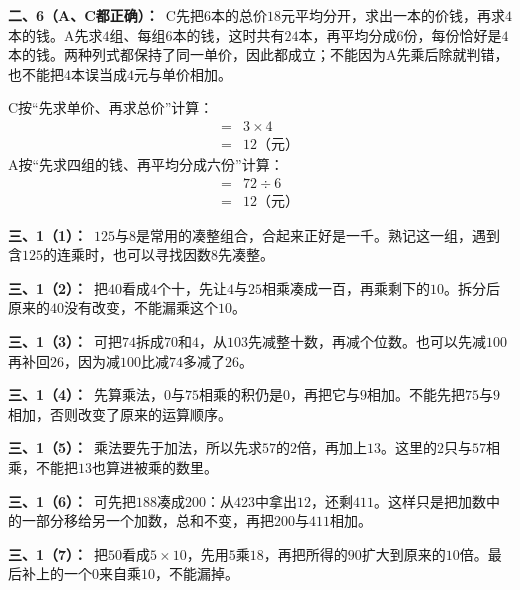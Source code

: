 \documentclass[multi=snippet,border=0pt]{standalone}
\newenvironment{snippet}[3]{\begin{minipage}{#1bp}\color{answerred}\fontsize{#2}{#3}\selectfont\raggedright}{\end{minipage}}
\begin{document}
\begin{snippet}{505}{11.5}{14}\textbf{二、6（A、C都正确）：}\ C先把\(6\)本的总价\(18\)元平均分开，求出一本的价钱，再求\(4\)本的钱。A先求\(4\)组、每组\(6\)本的钱，这时共有\(24\)本，再平均分成\(6\)份，每份恰好是\(4\)本的钱。两种列式都保持了同一单价，因此都成立；不能因为A先乘后除就判错，也不能把\(4\)本误当成\(4\)元与单价相加。\par C按“先求单价、再求总价”计算：\[\begin{aligned}={}&3\times4\\={}&12\text{（元）}\end{aligned}\]A按“先求四组的钱、再平均分成六份”计算：\[\begin{aligned}={}&72\div6\\={}&12\text{（元）}\end{aligned}\]\end{snippet}
\begin{snippet}{505}{11.5}{14}\textbf{三、1（1）：}\ \(125\)与\(8\)是常用的凑整组合，合起来正好是一千。熟记这一组，遇到含\(125\)的连乘时，也可以寻找因数\(8\)先凑整。\end{snippet}
\begin{snippet}{505}{11.5}{14}\textbf{三、1（2）：}\ 把\(40\)看成\(4\)个十，先让\(4\)与\(25\)相乘凑成一百，再乘剩下的\(10\)。拆分后原来的\(40\)没有改变，不能漏乘这个\(10\)。\end{snippet}
\begin{snippet}{505}{11.5}{14}\textbf{三、1（3）：}\ 可把\(74\)拆成\(70\)和\(4\)，从\(103\)先减整十数，再减个位数。也可以先减\(100\)再补回\(26\)，因为减\(100\)比减\(74\)多减了\(26\)。\end{snippet}
\begin{snippet}{505}{11.5}{14}\textbf{三、1（4）：}\ 先算乘法，\(0\)与\(75\)相乘的积仍是\(0\)，再把它与\(9\)相加。不能先把\(75\)与\(9\)相加，否则改变了原来的运算顺序。\end{snippet}
\begin{snippet}{505}{11.5}{14}\textbf{三、1（5）：}\ 乘法要先于加法，所以先求\(57\)的\(2\)倍，再加上\(13\)。这里的\(2\)只与\(57\)相乘，不能把\(13\)也算进被乘的数里。\end{snippet}
\begin{snippet}{505}{11.5}{14}\textbf{三、1（6）：}\ 可先把\(188\)凑成\(200\)：从\(423\)中拿出\(12\)，还剩\(411\)。这样只是把加数中的一部分移给另一个加数，总和不变，再把\(200\)与\(411\)相加。\end{snippet}
\begin{snippet}{505}{11.5}{14}\textbf{三、1（7）：}\ 把\(50\)看成\(5\times10\)，先用\(5\)乘\(18\)，再把所得的\(90\)扩大到原来的\(10\)倍。最后补上的一个\(0\)来自乘\(10\)，不能漏掉。\end{snippet}
\end{document}
